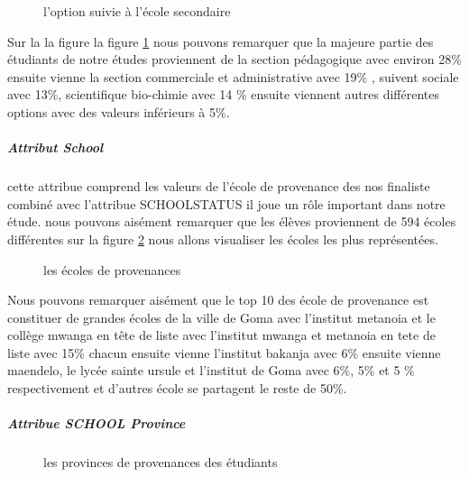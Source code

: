 \begin{figure}[!htbp]
	\centering
	\caption[Short caption]{l'option suivie à l'école secondaire }
	\label{fig:Option_right}
\end{figure}
Sur la la figure la figure \ref{fig:Option_right} nous pouvons remarquer que la majeure partie des
étudiants de notre études proviennent de la section pédagogique avec
environ 28\% ensuite vienne la section commerciale et administrative
avec 19\% , suivent sociale avec 13\%, scientifique bio-chimie avec 14
\% ensuite viennent autres différentes options avec des valeurs
inférieurs à 5\%.
\subparagraph{Attribut School}\label{attribut-school}
cette attribue comprend les valeurs de l'école de provenance des nos
finaliste combiné avec l'attribue SCHOOLSTATUS  il joue un rôle
important dans notre étude.
nous pouvons aisément remarquer que les élèves proviennent de 594 écoles
différentes sur la figure \ref{fig:SCHOOL} nous allons visualiser les écoles
les plus représentées.
\begin{figure}[!htbp]
	\centering
	\caption[Short caption]{les écoles de provenances  }
	\label{fig:SCHOOL}
\end{figure}
Nous pouvons remarquer aisément que le top 10 des école de provenance
est constituer de grandes écoles de la ville de Goma avec l'institut
metanoia et le collège mwanga en tête de liste avec l'institut mwanga et
metanoia en tete de liste avec 15\% chacun ensuite vienne l'institut
bakanja avec 6\% ensuite vienne maendelo, le lycée sainte ursule et
l'institut de Goma avec 6\%, 5\% et 5 \% respectivement et d'autres
école se partagent le reste de 50\%.
\subparagraph{Attribue SCHOOL Province}
\begin{figure}[!htbp]
	\centering
	\caption[Short caption]{les provinces de provenances des étudiants   }
	\label{fig:SCHOOLProvince}
\end{figure}
